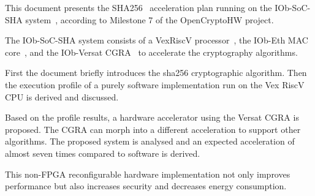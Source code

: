 This document presents the SHA256~\cite{SHA_NIST_FIPS} acceleration plan
running on the IOb-SoC-SHA system~\cite{iob-soc-sha}, according to Milestone 7
of the OpenCryptoHW project.

The IOb-SoC-SHA system consists of a VexRiscV processor~\cite{VexRiscv}, the
IOb-Eth MAC core~\cite{iob-eth}, and the IOb-Versat CGRA~\cite{iob-versat} to
accelerate the cryptography algorithms.

First the document briefly introduces the sha256 cryptographic algorithm. Then
the execution profile of a purely software implementation run on the Vex RiscV
CPU is derived and discussed.

Based on the profile results, a hardware accelerator using the Versat CGRA is
proposed. The CGRA can morph into a different acceleration to support other
algorithms. The proposed system is analysed and an expected acceleration of
almost seven times compared to software is derived.

This non-FPGA reconfigurable hardware implementation not only improves
performance but also increases security and decreases energy consumption.

